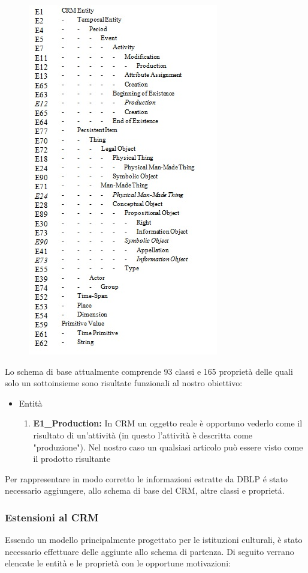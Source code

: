 \documentclass[11pt,a4paper]{article}
\begin{document}
\begin{figure} [!h] 
	\centering
	\includegraphics[scale=1.50]{immaginiTesina/ridotto.jpg}
\end{figure}
 Lo schema di base attualmente comprende  93 classi e 165 proprietà delle quali solo un sottoinsieme sono risultate funzionali al nostro obiettivo:
	 \begin{itemize}
	 	\item Entità
	 	\begin{enumerate}
	 		\item \textbf{E1\_Production:} In CRM un oggetto reale è opportuno vederlo come il risultato di un'attività (in questo l'attività è descritta come "produzione"). Nel nostro caso un qualsiasi articolo può essere visto come il prodotto risultante
	 	\end{enumerate}
	 \end{itemize}
 
 Per rappresentare in modo corretto le informazioni estratte da DBLP \'e stato necessario aggiungere, allo schema di base del CRM, altre classi e propriet\'a.  \newline

\subsubsection{Estensioni al CRM}
Essendo un modello principalmente progettato per le istituzioni culturali, è stato necessario effettuare delle aggiunte allo schema di partenza. Di seguito verrano elencate le entità e le proprietà con le opportune motivazioni:
\end{document}
